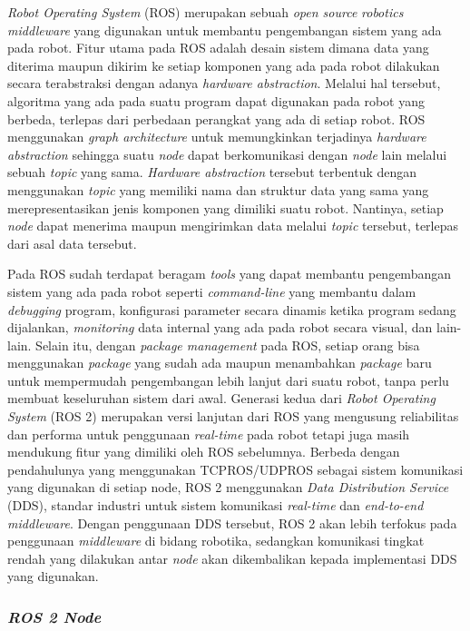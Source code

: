 \textit{Robot Operating System} (ROS) \parencite{quigley} merupakan sebuah \textit{open source} \textit{robotics middleware} yang digunakan untuk membantu pengembangan sistem yang ada pada robot. Fitur utama
pada ROS adalah desain sistem dimana data yang diterima maupun dikirim ke setiap komponen yang ada pada robot dilakukan secara terabstraksi dengan adanya \textit{hardware abstraction}. Melalui hal tersebut, algoritma yang ada pada suatu program
dapat digunakan pada robot yang berbeda, terlepas dari perbedaan perangkat yang ada di setiap robot.
ROS menggunakan \textit{graph architecture} untuk memungkinkan terjadinya \textit{hardware abstraction} sehingga suatu \textit{node} dapat berkomunikasi dengan \textit{node} lain melalui sebuah \textit{topic} yang sama.
\textit{Hardware abstraction} tersebut terbentuk dengan menggunakan \textit{topic} yang memiliki nama dan struktur data yang sama yang merepresentasikan jenis komponen yang dimiliki suatu robot.
Nantinya, setiap \textit{node} dapat menerima maupun mengirimkan data melalui \textit{topic} tersebut, terlepas dari asal data tersebut.

Pada ROS sudah terdapat beragam \textit{tools} yang dapat membantu pengembangan sistem yang ada pada robot seperti \textit{command-line} yang membantu dalam \textit{debugging} program,
konfigurasi parameter secara dinamis ketika program sedang dijalankan, \textit{monitoring} data internal yang ada pada robot secara visual,
dan lain-lain. Selain itu, dengan \textit{package management} pada ROS, setiap orang bisa menggunakan \textit{package} yang sudah
ada maupun menambahkan \textit{package} baru untuk mempermudah pengembangan lebih lanjut dari suatu robot, tanpa perlu membuat keseluruhan sistem dari awal.
Generasi kedua dari \textit{Robot Operating System} (ROS 2) merupakan versi lanjutan dari ROS yang mengusung reliabilitas dan performa untuk penggunaan \textit{real-time} pada robot tetapi juga masih mendukung fitur yang dimiliki oleh ROS sebelumnya. Berbeda dengan
pendahulunya yang menggunakan TCPROS/UDPROS sebagai sistem komunikasi yang digunakan di setiap node, ROS 2 menggunakan \textit{Data Distribution Service} (DDS), standar industri
untuk sistem komunikasi \textit{real-time} dan \textit{end-to-end middleware}. Dengan penggunaan DDS tersebut, ROS 2 akan lebih terfokus pada
penggunaan \textit{middleware} di bidang robotika, sedangkan komunikasi tingkat rendah yang dilakukan antar \textit{node} akan dikembalikan kepada implementasi DDS yang digunakan.

\subsubsection{\textit{ROS 2 Node}}
\label{subsubsec:ros2node}

